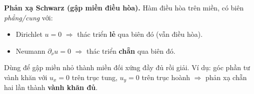 \textbf{Phản xạ Schwarz (gập miền điều hòa).}
Hàm điều hòa trên miền, có biên \emph{phẳng/cung} với:
\begin{itemize}
  \item Dirichlet $u=0$ $\Rightarrow$ thác triển \textbf{lẻ} qua biên đó (vẫn điều hòa).
  \item Neumann $\partial_\nu u=0$ $\Rightarrow$ thác triển \textbf{chẵn} qua biên đó.
\end{itemize}
Dùng để gập miền nhỏ thành miền đối xứng đầy đủ rồi giải. Ví dụ: góc phần tư vành khăn với
$u_x=0$ trên trục tung, $u_y=0$ trên trục hoành $\Rightarrow$ phản xạ chẵn hai lần thành \textbf{vành khăn đủ}.
